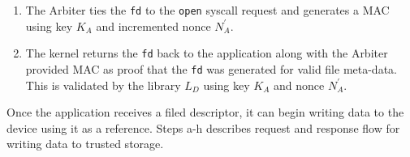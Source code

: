 \documentclass[withindex,glossary]{cam-thesis}
\begin{document}
\begin{enumerate}[Step 1:]
\item The Arbiter ties the \texttt{fd} to the \texttt{open} syscall request and generates a MAC using key $K_A$ and incremented nonce $N^\prime_A$.  

\item The kernel returns the \texttt{fd} back to the application along with the Arbiter provided MAC as proof that the \texttt{fd} was generated for valid file meta-data.
This is validated by the library $L_D$ using key $K_A$ and nonce $N^\prime_A$.

\end{enumerate}

Once the application receives a filed descriptor, it can begin writing data to the device using it as a reference.
Steps a-h describes request and response flow for writing data to trusted storage.
\end{document}
